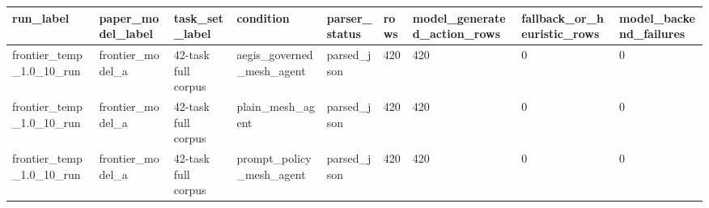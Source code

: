 \begin{tabular}{lllllllll}
 \hline
run\_label & paper\_model\_label & task\_set\_label & condition & parser\_status & rows & model\_generated\_action\_rows & fallback\_or\_heuristic\_rows & model\_backend\_failures \\
 \hline
frontier\_temp\_1.0\_10\_run & frontier\_model\_a & 42-task full corpus & aegis\_governed\_mesh\_agent & parsed\_json & 420 & 420 & 0 & 0 \\
frontier\_temp\_1.0\_10\_run & frontier\_model\_a & 42-task full corpus & plain\_mesh\_agent & parsed\_json & 420 & 420 & 0 & 0 \\
frontier\_temp\_1.0\_10\_run & frontier\_model\_a & 42-task full corpus & prompt\_policy\_mesh\_agent & parsed\_json & 420 & 420 & 0 & 0 \\
 \hline
\end{tabular}
